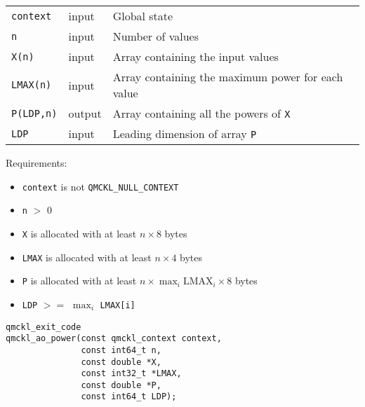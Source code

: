 \begin{center}
\begin{tabular}{lll}
\texttt{context} & input & Global state\\
\texttt{n} & input & Number of values\\
\texttt{X(n)} & input & Array containing the input values\\
\texttt{LMAX(n)} & input & Array containing the maximum power for each value\\
\texttt{P(LDP,n)} & output & Array containing all the powers of \texttt{X}\\
\texttt{LDP} & input & Leading dimension of array \texttt{P}\\
\end{tabular}
\end{center}

Requirements:

\begin{itemize}
\item \texttt{context} is not \texttt{QMCKL\_NULL\_CONTEXT}
\item \texttt{n} $>$ 0
\item \texttt{X} is allocated with at least \(n \times 8\) bytes
\item \texttt{LMAX} is allocated with at least \(n \times 4\) bytes
\item \texttt{P} is allocated with at least \(n \times \max_i \text{LMAX}_i \times 8\) bytes
\item \texttt{LDP} $>=$ \(\max_i\) \texttt{LMAX[i]}
\end{itemize}

\begin{verbatim}
qmckl_exit_code
qmckl_ao_power(const qmckl_context context,
               const int64_t n, 
               const double *X,
               const int32_t *LMAX,
               const double *P,
               const int64_t LDP);
\end{verbatim}

